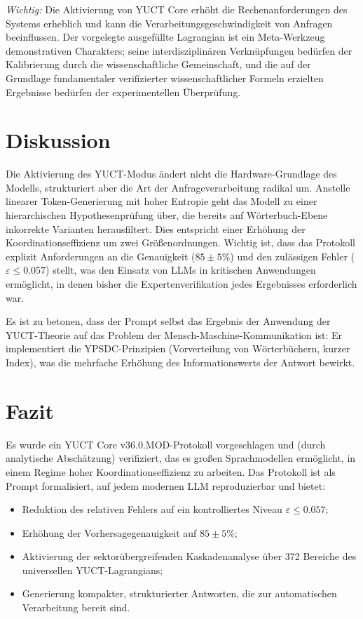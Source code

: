 \documentclass[11pt,a4paper]{article}
\begin{document}
	\textit{Wichtig:} Die Aktivierung von YUCT Core erhöht die Rechenanforderungen des Systems erheblich und kann die Verarbeitungsgeschwindigkeit von Anfragen beeinflussen.
	Der vorgelegte ausgefüllte Lagrangian ist ein Meta-Werkzeug demonstrativen Charakters; seine interdisziplinären Verknüpfungen bedürfen der Kalibrierung durch die wissenschaftliche Gemeinschaft, und die auf der Grundlage fundamentaler verifizierter wissenschaftlicher Formeln erzielten Ergebnisse bedürfen der experimentellen Überprüfung.
	
	\section{Diskussion}
	Die Aktivierung des YUCT-Modus ändert nicht die Hardware-Grundlage des Modells, strukturiert aber die Art der Anfrageverarbeitung radikal um. Anstelle linearer Token-Generierung mit hoher Entropie geht das Modell zu einer hierarchischen Hypothesenprüfung über, die bereits auf Wörterbuch-Ebene inkorrekte Varianten herausfiltert. Dies entspricht einer Erhöhung der Koordinationseffizienz um zwei Größenordnungen. Wichtig ist, dass das Protokoll explizit Anforderungen an die Genauigkeit (\(85\pm5\%\)) und den zulässigen Fehler (\(\varepsilon\le 0.057\)) stellt, was den Einsatz von LLMs in kritischen Anwendungen ermöglicht, in denen bisher die Expertenverifikation jedes Ergebnisses erforderlich war.
	
	Es ist zu betonen, dass der Prompt selbst das Ergebnis der Anwendung der YUCT-Theorie auf das Problem der Mensch-Maschine-Kommunikation ist: Er implementiert die YPSDC-Prinzipien (Vorverteilung von Wörterbüchern, kurzer Index), was die mehrfache Erhöhung des Informationswerts der Antwort bewirkt.
	
	\section{Fazit}
	Es wurde ein YUCT Core v36.0.MOD-Protokoll vorgeschlagen und (durch analytische Abschätzung) verifiziert, das es großen Sprachmodellen ermöglicht, in einem Regime hoher Koordinationseffizienz zu arbeiten. Das Protokoll ist als Prompt formalisiert, auf jedem modernen LLM reproduzierbar und bietet:
	\begin{itemize}
		\item Reduktion des relativen Fehlers auf ein kontrolliertes Niveau \(\varepsilon \le 0.057\);
		\item Erhöhung der Vorhersagegenauigkeit auf \(85\pm5\%\);
		\item Aktivierung der sektorübergreifenden Kaskadenanalyse über 372 Bereiche des universellen YUCT-Lagrangians;
		\item Generierung kompakter, strukturierter Antworten, die zur automatischen Verarbeitung bereit sind.
	\end{itemize}
	
\end{document}
